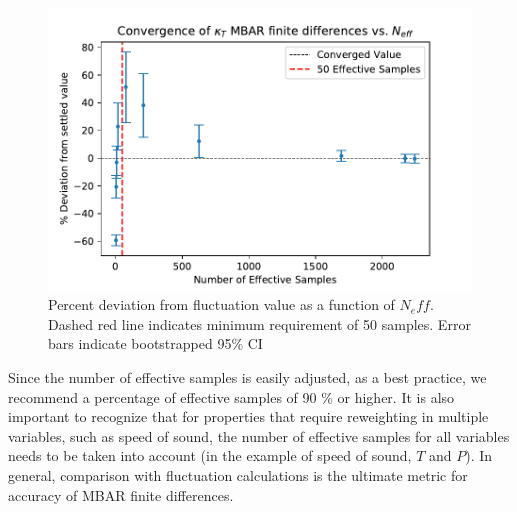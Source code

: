 \documentclass[aps,pre,twocolumn,nofootinbib,superscriptaddress,linenumbers,10pt, draft,tightenlines]{revtex4-1}
\begin{document}
\begin{figure}[H]
\includegraphics[width=\textwidth-40pt]{kt_vs_n_eff.pdf}
\caption{Percent deviation from fluctuation value as a function of $N_eff$.  Dashed red line indicates minimum requirement of 50 samples.  Error bars indicate bootstrapped 95\% CI}
\end{figure}

  Since the number of effective samples is easily adjusted, as a best practice, we recommend a percentage of effective samples of 90 \% or higher.  It is also important to recognize that for properties that require reweighting in multiple variables, such as speed of sound, the number of effective samples for all variables needs to be taken into account (in the example of speed of sound, $T$ and $P$).  In general, comparison with fluctuation calculations is the ultimate metric for accuracy of MBAR finite differences.
\end{document}
